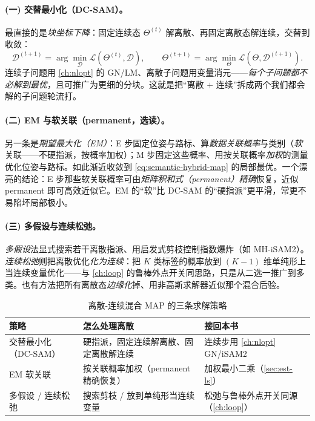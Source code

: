 \paragraph{(一) 交替最小化（DC-SAM）。}
最直接的是\emph{块坐标下降}：固定连续态 $\Theta^{(t)}$ 解离散、再固定离散态解连续，交替到收敛\cite{doherty2022discrete}：
\begin{equation}
  \mathcal{D}^{(t+1)}=\arg\min_{\mathcal{D}}\mathcal{L}(\Theta^{(t)},\mathcal{D}),
  \qquad
  \Theta^{(t+1)}=\arg\min_{\Theta}\mathcal{L}(\Theta,\mathcal{D}^{(t+1)}).
  \label{eq:semantic-hybrid-dcsam}
\end{equation}
连续子问题用 \cref{ch:nlopt} 的 GN/LM、离散子问题用变量消元——\emph{每个子问题都不必解到最优}，且可推广为更细的分块。这就是把“离散 $+$ 连续”拆成两个我们都会解的子问题轮流打。

\paragraph{(二) EM 与软关联（permanent，选读）。}
另一条是\emph{期望最大化（EM）}\cite{bowman2017probabilistic}：E 步固定位姿与路标、算\emph{数据关联概率}与类别（\emph{软}关联——不硬指派，按概率加权）；M 步固定这些概率、用按关联概率\emph{加权}的测量优化位姿与路标。如此渐近收敛到 \cref{eq:semantic-hybrid-map} 的局部最优。一个漂亮的结论：E 步那些软关联概率可由\emph{矩阵积和式（permanent）}\emph{精确}恢复，近似 permanent 即可高效近似它\cite{atanasov2016localization}。EM 的“软”比 DC-SAM 的“硬指派”更平滑，常更不易陷坏局部极小。

\paragraph{(三) 多假设与连续松弛。}
\emph{多假设}法\cite{hsiao2019dynamicmh}显式搜索若干离散指派、用启发式剪枝控制指数爆炸（如 MH-iSAM2）。\emph{连续松弛}则把离散优化\emph{化为连续}\cite{sunderhauf2016dual}：把 $K$ 类标签的概率放到 $(K{-}1)$ 维单纯形上当连续变量优化——与 \cref{ch:loop} 的鲁棒外点开关同思路，只是从二选一推广到多类。也有方法把所有离散态\emph{边缘化}掉、用非高斯求解器近似那个混合后验\cite{fourie2017nonparametric}。

\begin{table}[H]\centering\small
\caption{离散-连续混合 MAP 的三条求解策略}
\label{tab:semantic-solve}
\begin{tabular}{p{} p{} p{}}
\toprule
策略 & 怎么处理离散 & 接回本书 \\
\midrule
交替最小化（DC-SAM） & 硬指派，固定连续解离散、固定离散解连续 & 连续步用 \cref{ch:nlopt} GN/iSAM2 \\
EM 软关联 & 按关联概率加权（permanent 精确恢复） & 加权最小二乘（\cref{sec:est-ls}） \\
多假设 / 连续松弛 & 搜索剪枝 / 放到单纯形当连续变量 & 松弛与鲁棒外点开关同源（\cref{ch:loop}） \\
\bottomrule
\end{tabular}
\end{table}

